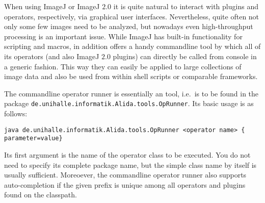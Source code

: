 When using ImageJ or ImageJ $2.0$ it is quite natural to interact with plugins and operators, respectively, via 
graphical user interfaces. Nevertheless, quite often not only some few images need to be analyzed,
but nowadays even high-throughput processing is an important issue. While ImageJ has built-in
functionality for scripting and macros, \mitobo in addition offers a handy commandline tool by 
which all of its operators (and also ImageJ $2.0$ plugins) can directly be called from console in a
generic fashion. This way they can easily be applied to large collections of image data and also be used
from within shell scripts or comparable frameworks.  

The commandline operator runner is essentially an \alida tool, i.e.~is to be found in the package
{\tt de.unihalle.informatik.Alida.tools.OpRunner}. Its basic usage is as follows:
{\small
\begin{center}
{\tt java  de.unihalle.informatik.Alida.tools.OpRunner  <operator name>  \{
parameter=value\}}
\end{center}
}
Its first argument is the name of the operator class to be executed. You do not need to specify its complete 
package name, but the simple class name by itself is usually sufficient. Moreoever, the commandline 
operator runner also supports auto-completion if the given prefix is unique among all operators 
and plugins found on the classpath.  


